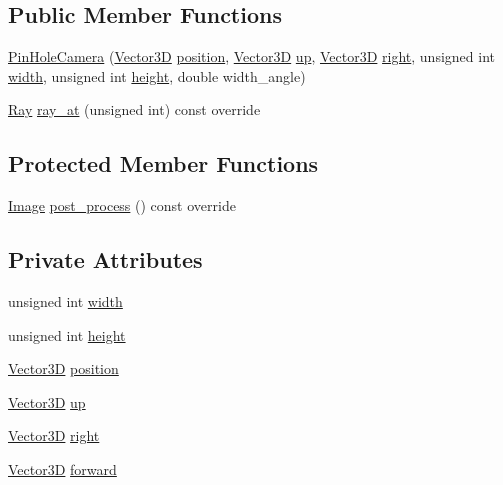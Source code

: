 \subsection*{Public Member Functions}
\begin{DoxyCompactItemize}
\item 
\mbox{\hyperlink{classcamera_1_1PinHoleCamera_a0d7c74abd23ababb8e244fade0443f15}{Pin\+Hole\+Camera}} (\mbox{\hyperlink{classVector3D}{Vector3D}} \mbox{\hyperlink{classcamera_1_1PinHoleCamera_a1da1c0a5fd23a13becf47e5701ac63d6}{position}}, \mbox{\hyperlink{classVector3D}{Vector3D}} \mbox{\hyperlink{classcamera_1_1PinHoleCamera_ae0cbcdd56cd87fe2b90a2934ff1d37a8}{up}}, \mbox{\hyperlink{classVector3D}{Vector3D}} \mbox{\hyperlink{classcamera_1_1PinHoleCamera_a5c2502b1ff78c2e25c5e75cc02b91918}{right}}, unsigned int \mbox{\hyperlink{classcamera_1_1PinHoleCamera_a84af11864219ddf7d2e3ddb0a7888d56}{width}}, unsigned int \mbox{\hyperlink{classcamera_1_1PinHoleCamera_a2a2e02ab02a6dcb59b0de224f7c629ba}{height}}, double width\+\_\+angle)
\item 
\mbox{\hyperlink{classRay}{Ray}} \mbox{\hyperlink{classcamera_1_1PinHoleCamera_ab2457caa55561521cab10490e67ba8c8}{ray\+\_\+at}} (unsigned int) const override
\end{DoxyCompactItemize}
\subsection*{Protected Member Functions}
\begin{DoxyCompactItemize}
\item 
\mbox{\hyperlink{namespacecamera_a7ac4fbfbf1f82c10ad94680fb8113483}{Image}} \mbox{\hyperlink{classcamera_1_1PinHoleCamera_a1ed550429343036f2dd14a0aacbe2c27}{post\+\_\+process}} () const override
\end{DoxyCompactItemize}
\subsection*{Private Attributes}
\begin{DoxyCompactItemize}
\item 
unsigned int \mbox{\hyperlink{classcamera_1_1PinHoleCamera_a84af11864219ddf7d2e3ddb0a7888d56}{width}}
\item 
unsigned int \mbox{\hyperlink{classcamera_1_1PinHoleCamera_a2a2e02ab02a6dcb59b0de224f7c629ba}{height}}
\item 
\mbox{\hyperlink{classVector3D}{Vector3D}} \mbox{\hyperlink{classcamera_1_1PinHoleCamera_a1da1c0a5fd23a13becf47e5701ac63d6}{position}}
\item 
\mbox{\hyperlink{classVector3D}{Vector3D}} \mbox{\hyperlink{classcamera_1_1PinHoleCamera_ae0cbcdd56cd87fe2b90a2934ff1d37a8}{up}}
\item 
\mbox{\hyperlink{classVector3D}{Vector3D}} \mbox{\hyperlink{classcamera_1_1PinHoleCamera_a5c2502b1ff78c2e25c5e75cc02b91918}{right}}
\item 
\mbox{\hyperlink{classVector3D}{Vector3D}} \mbox{\hyperlink{classcamera_1_1PinHoleCamera_a2db605d2a78469feeda2cff0f01369c8}{forward}}
\end{DoxyCompactItemize}

